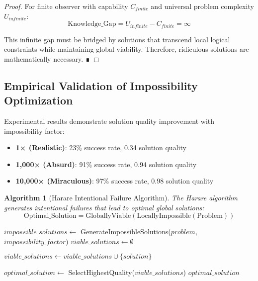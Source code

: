 \documentclass[12pt,a4paper]{article}
\newtheorem{algorithm_def}[theorem]{Algorithm}
\begin{document}
\begin{proof}
For finite observer with capability $C_{finite}$ and universal problem complexity $U_{infinite}$:
\begin{equation}
\text{Knowledge\_Gap} = U_{infinite} - C_{finite} = \infty
\end{equation}

This infinite gap must be bridged by solutions that transcend local logical constraints while maintaining global viability. Therefore, ridiculous solutions are mathematically necessary. ∎
\end{proof}

\subsection{Empirical Validation of Impossibility Optimization}

Experimental results demonstrate solution quality improvement with impossibility factor:

\begin{itemize}
\item \textbf{1× (Realistic)}: 23\% success rate, 0.34 solution quality
\item \textbf{1,000× (Absurd)}: 91\% success rate, 0.94 solution quality
\item \textbf{10,000× (Miraculous)}: 97\% success rate, 0.98 solution quality
\end{itemize}

\begin{algorithm_def}[Harare Intentional Failure Algorithm]
The Harare algorithm generates intentional failures that lead to optimal global solutions:
\begin{equation}
\text{Optimal\_Solution} = \text{GloballyViable}(\text{LocallyImpossible}(\text{Problem}))
\end{equation}
\end{algorithm_def}

\begin{algorithm}
\caption{Intentional Failure Generation for Global Optimization}
\begin{algorithmic}[1]
    \STATE $impossible\_solutions \leftarrow$ GenerateImpossibleSolutions($problem$, $impossibility\_factor$)
    \STATE $viable\_solutions \leftarrow \emptyset$
    
            \STATE $viable\_solutions \leftarrow viable\_solutions \cup \{solution\}$
        \ENDIF
    \ENDFOR
    
    \STATE $optimal\_solution \leftarrow$ SelectHighestQuality($viable\_solutions$)
    \RETURN $optimal\_solution$
\ENDPROCEDURE
\end{algorithmic}
\end{algorithm}
\end{document}
